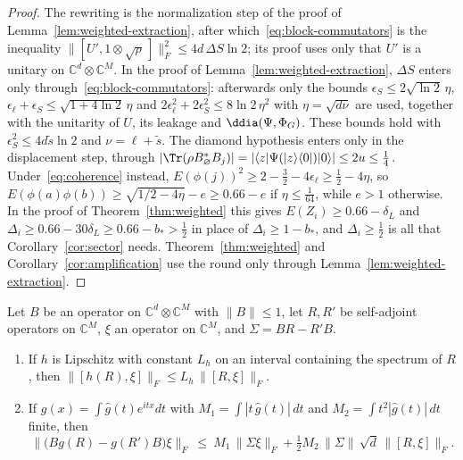 \begin{proof}
The rewriting is the normalization step of the proof of Lemma~\ref{lem:weighted-extraction}, after which~\eqref{eq:block-commutators} is
the inequality $\|[U',1\otimes\sqrt\rho\,]\|_F^2\le4d\,\Delta S\ln2$; its proof uses only that $U'$ is a unitary on $\mathbb C^d\otimes\mathbb C^M$. In
the proof of Lemma~\ref{lem:weighted-extraction}, $\Delta S$ enters only through~\eqref{eq:block-commutators}: afterwards only the bounds
$\epsilon_S\le2\sqrt{\ln2}\,\eta$, $\epsilon_\ell+\epsilon_S\le\sqrt{1+4\ln2}\,\eta$ and $2\epsilon_\ell^2+2\epsilon_S^2\le8\ln2\,\eta^2$ with $\eta=\sqrt{d\nu}$ are used,
together with the unitarity of $U$, its leakage and $\ddia(\Psi,\Phi_G)$. These bounds hold with $\epsilon_S^2\le4d\tilde s\ln2$ and $\nu=\ell+\tilde s$. The diamond hypothesis enters only in the displacement step, through
$|\Tr(\rho B_\varnothing^*B_j)|=|\langle z|\Psi(|z\rangle\langle0|)|0\rangle|\le2u\le\frac14$. Under~\eqref{eq:coherence} instead,
$E(\phi(j))^2\ge2-\frac32-4\epsilon_\ell\ge\frac12-4\eta$, so $E(\phi(a)\phi(b))\ge\sqrt{1/2-4\eta}-e\ge0.66-e$ if $\eta\le\frac1{64}$, while $e>1$ otherwise. In
the proof of Theorem~\ref{thm:weighted} this gives $E(Z_i)\ge0.66-\delta_L$ and $\Delta_i\ge0.66-30\delta_L\ge0.66-b_*>\frac12$ in place of
$\Delta_i\ge1-b_*$, and $\Delta_i\ge\frac12$ is all that Corollary~\ref{cor:sector} needs. Theorem~\ref{thm:weighted} and Corollary~\ref{cor:amplification} use
the round only through Lemma~\ref{lem:weighted-extraction}.
\end{proof}

\begin{lemma}\label{lem:twisted}
Let $B$ be an operator on $\mathbb C^d\otimes\mathbb C^M$ with $\|B\|\le1$, let $R,R'$ be self-adjoint operators on $\mathbb C^M$, $\xi$ an operator on $\mathbb C^M$, and
$\Sigma=BR-R'B$.
\begin{enumerate}[label=(\roman*),itemsep=1pt]
\item If $h$ is Lipschitz with constant $L_h$ on an interval containing the spectrum of $R$, then $\|[h(R),\xi]\|_F\le L_h\,\|[R,\xi]\|_F$.
\item If $g(x)=\int\hat g(t)e^{itx}dt$ with $M_1=\int|t\,\hat g(t)|\,dt$ and $M_2=\int t^2|\hat g(t)|\,dt$ finite, then
\[
\bigl\|\bigl(Bg(R)-g(R')B\bigr)\xi\bigr\|_F\ \le\ M_1\,\|\Sigma\xi\|_F+\tfrac12M_2\,\|\Sigma\|\,\sqrt d\,\|[R,\xi]\|_F .
\]
\end{enumerate}
\end{lemma}

